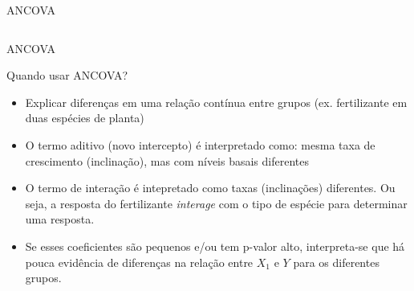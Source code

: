\documentclass{beamer}\usepackage[]{graphicx}\usepackage[]{color}
\newenvironment{knitrout}{}{} %
\renewenvironment{knitrout}{\setlength{\topsep}{0mm}}{}
\begin{document}
\begin{frame}[fragile]{ANCOVA}
\begin{columns}
\begin{knitrout}
\end{knitrout}


\end{columns}

\end{frame}


\begin{frame}{ANCOVA}

\begin{small}

Quando usar ANCOVA?
\vfill
\begin{itemize}
\item Explicar diferenças em uma relação contínua entre grupos (ex. fertilizante em duas espécies de planta) 
\vfill
\item O termo aditivo (novo intercepto) é interpretado como: mesma taxa de crescimento (inclinação), mas com níveis basais diferentes
\vfill
\item O termo de interação é intepretado como taxas (inclinações) diferentes. Ou seja, a resposta do fertilizante \emph{interage} com o tipo de espécie para determinar uma resposta.

\vfill
\item Se esses coeficientes são pequenos e/ou tem p-valor alto, interpreta-se que há pouca evidência de diferenças na relação entre $X_1$ e $Y$ para os diferentes grupos.
\end{itemize}

\end{small}

\end{frame}
\end{document}
